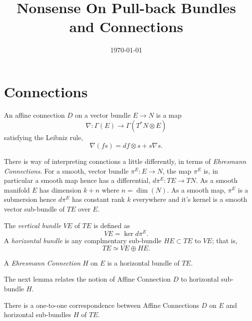 \documentclass{amsart}
\begin{document}
\title[Pull-back Bundle Nonsense]
 {Nonsense On Pull-back Bundles and Connections}

\curraddr{}
\email{}
\date{\today}

\dedicatory{}
\subjclass[2010]{}
\keywords{}

\maketitle

\section{Connections}

\begin{defn}
An affine connection \(D\) on a vector bundle \(E \to N\) is a map
\[
\nabla : \Gamma(E) \to \Gamma(T^{\ast} N \otimes E)
\]
satisfying the Leibniz rule,
\[
\nabla (f s) = df \otimes s + s \nabla s.
\]
\end{defn}

There is way of interpreting connctions a little differently, in terms of \emph{Ehresmann Connections}. For a smooth, vector bundle \(\pi^E : E \to N\), the map \(\pi^E\) is, in particular a smooth map hence has a differential, \(d\pi^E : TE \to TN\). As a smooth manifold \(E\) has dimension \(k+n\) where \(n = \operatorname{dim} (N)\). As a smooth map, \(\pi^E\) is a submersion hence \(d\pi^E\) has constant rank \(k\) everywhere and it's kernel is a smooth vector sub-bundle of \(TE\) over \(E\).

\begin{defn}
The \emph{vertical bundle} \(VE\) of \(TE\) is defined as
\[
VE = \operatorname{ker} d\pi^E.
\]
A \emph{horizontal bundle} is any complmentary sub-bundle \(HE \subset TE\) to \(VE\); that is,
\[
TE \simeq VE \oplus HE.
\]
\end{defn}

\begin{defn}
A \emph{Ehresmann Connection} \(H\) on \(E\) is a horizontal bundle of \(TE\).
\end{defn}

The next lemma relates the notion of Affine Connection \(D\) to horizontal sub-bundle \(H\).

\begin{lemma}
There is a one-to-one correspondence between Affine Connections \(D\) on \(E\) and horizontal sub-bundles \(H\) of \(TE\).
\end{lemma}
\end{document}
